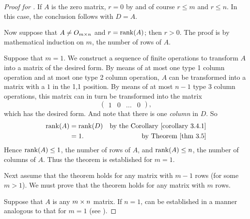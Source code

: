 \begin{proof}[Proof for ]
If \(A\) is the zero matrix, \(r = 0\) by  and of course \(r \le m\) and \(r \le n\).
In this case, the conclusion follows with \(D = A\).

Now suppose that \(A \ne O_{m \times n}\) and \(r = \mathrm{rank}(A)\);
then \(r > 0\).
The proof is by mathematical induction on \(m\), the number of rows of \(A\).

Suppose that \(m = 1\).
We construct a sequence of finite operations to transform \(A\) into a matrix of the desired form.
By means of at most one type 1 column operation and at most one type 2 column operation, \(A\) can be transformed into a matrix with a \(1\) in the 1,1 position.
By means of at most \(n - 1\) type 3 column operations, this matrix can in turn be transformed into the matrix
\[
    \begin{pmatrix} 1 & 0 & ... & 0 \end{pmatrix},
\]
which has the desired form.
And note that there is one \LID{} \emph{column} in \(D\).
So
\begin{align*}
    \rank(A) & = \rank(D) & \text{by the \CORO{3.4.1}} \\
             & = 1. & \text{by \THM{3.5}}
\end{align*}
Hence \(\mathrm{rank}(A) \le 1\), the number of rows of \(A\), and \(\mathrm{rank}(A) \le n\), the number of columns of \(A\).
Thus the theorem is established for \(m = 1\).

Next assume that the theorem holds for any matrix with \(m - 1\) rows (for some \(m > 1\)).
We must prove that the theorem holds for any matrix with \(m\) rows.

Suppose that \(A\) is any \(m \times n\) matrix.
If \(n = 1\),  can be established in a manner analogous to that for \(m = 1\) (see ).


\end{proof}
